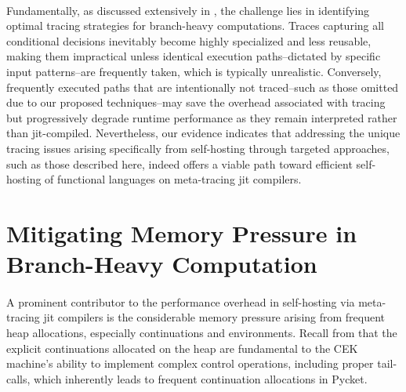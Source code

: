     \paragraph{}%
      Fundamentally, as discussed extensively in , the challenge lies in identifying optimal tracing strategies for branch-heavy computations. Traces capturing all conditional decisions inevitably become highly specialized and less reusable, making them impractical unless identical execution paths--dictated by specific input patterns--are frequently taken, which is typically unrealistic. Conversely, frequently executed paths that are intentionally not traced--such as those omitted due to our proposed techniques--may save the overhead associated with tracing but progressively degrade runtime performance as they remain interpreted rather than \gls{jit}-compiled. Nevertheless, our evidence indicates that addressing the unique tracing issues arising specifically from self-hosting through targeted approaches, such as those described here, indeed offers a viable path toward efficient self-hosting of functional languages on meta-tracing \gls{jit} compilers.

	\section[\texorpdfstring{Mitigating Memory Pressure in Branch-Heavy Computation}{CEK + Stackful Model}]{Mitigating Memory Pressure in Branch-Heavy Computation}
    \label{section:stackful}

    \paragraph{}%
      A prominent contributor to the performance overhead in self-hosting via meta-tracing \gls{jit} compilers is the considerable memory pressure arising from frequent heap allocations, especially continuations and environments. Recall from  that the explicit continuations allocated on the heap are fundamental to the CEK machine's ability to implement complex control operations, including proper tail-calls, which inherently leads to frequent continuation allocations in Pycket.

